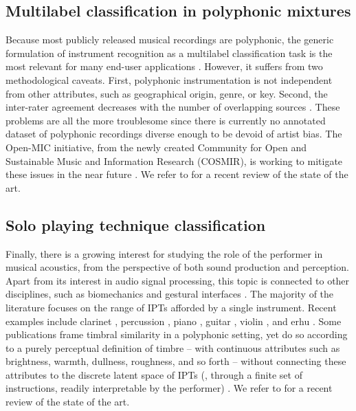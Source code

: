 \subsection{Multilabel classification in polyphonic mixtures}
Because most publicly released musical recordings are polyphonic, the generic formulation of instrument recognition as a multilabel classification task is the most relevant for many end-user applications \cite{martins2007ismir,burred2009icassp}.
However, it suffers from two methodological caveats.
First, polyphonic instrumentation is not independent from other attributes, such as geographical origin, genre, or key.
Second, the inter-rater agreement decreases with the number of overlapping sources \cite[chapter 6]{fuhrmann2012phd}.
These problems are all the more troublesome since there is currently no annotated dataset of polyphonic recordings diverse enough to be devoid of artist bias.
The Open-MIC initiative, from the newly created Community for Open and Sustainable Music and Information Research (COSMIR), is working to mitigate these issues in the near future \cite{mcfee2016ismir}.
We refer to \cite{humphrey2018ismir} for a recent review of the state of the art.

\subsection{Solo playing technique classification}
Finally, there is a growing interest for studying the role of the performer in musical acoustics, from the perspective of both sound production and perception.
Apart from its interest in audio signal processing, this topic is connected to other disciplines, such as biomechanics and gestural interfaces \cite{metcalf2014frontiers}.
The majority of the literature focuses on the range of IPTs afforded by a single instrument.
Recent examples include clarinet \cite{loureiro2004ismir}, percussion \cite{tindale2004ismir}, piano \cite{bernays2013smc}, guitar \cite{foulon2013cmmr,su2014ismir,chen2015ismir}, violin \cite{young2008nime}, %
and erhu \cite{yang2014fma}.
Some publications frame timbral similarity in a polyphonic setting, yet do so according to a purely perceptual definition of timbre -- with continuous attributes such as brightness, warmth, dullness, roughness, and so forth -- without connecting these attributes to the discrete latent space of IPTs (\ie{}, through a finite set of instructions, readily interpretable by the performer) \cite{antoine2018isma}.
We refer to \cite{leman2017chapter} for a recent review of the state of the art.

